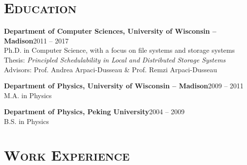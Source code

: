 \documentclass[10pt, letterpaper]{article}
\renewenvironment{itemize}{
  \begin{list}{}{
    \setlength{\leftmargin}{1.2em}
    \setlength{\itemsep}{0.12em}
    \setlength{\parskip}{0pt}
    \setlength{\parsep}{0.12em}
  }
}{
  \end{list}
}
\begin{document}
\section*{\textsc{Education}}
\begin{itemize}
  \item {\bf Department of Computer Sciences, University of Wisconsin -- Madison}\hfill 2011 --  2017\\
    Ph.D. in Computer Science, with a focus on file systems and storage systems\\
    Thesis: {\it Principled Schedulability in Local and Distributed Storage Systems}\\
    Advisors: { Prof. Andrea Arpaci-Dusseau \& Prof. Remzi Arpaci-Dusseau}%

  \item {\bf Department of Physics, University of Wisconsin -- Madison}\hfill 2009 -- 2011\\
    M.A. in Physics %

  \item {\bf Department of Physics, Peking University}\hfill 2004 -- 2009\\
    B.S. in Physics
\end{itemize}

\section*{\textsc{Work Experience}}
\end{document}
